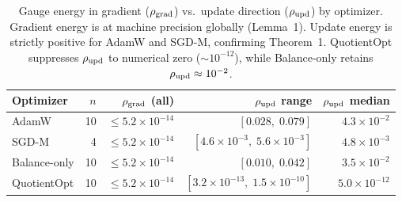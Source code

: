 \begin{table}[t]
\centering
\caption{Gauge energy in gradient ($\rho_{\rm grad}$) vs.\ update direction ($\rho_{\rm upd}$)
  by optimizer. Gradient energy is at machine precision globally (Lemma~1). Update energy is
  strictly positive for AdamW and SGD-M, confirming Theorem~1. QuotientOpt suppresses
  $\rho_{\rm upd}$ to numerical zero (${\sim}10^{-12}$), while Balance-only retains
  $\rho_{\rm upd}\approx 10^{-2}$.}
\label{tab:rho-summary}
\vspace{4pt}
\begin{tabular}{lrrrr}
\toprule
\textbf{Optimizer} & $n$ & $\rho_{\rm grad}$ (all) & $\rho_{\rm upd}$ range & $\rho_{\rm upd}$ median \\
\midrule
AdamW        & 10 & $\leq 5.2{\times}10^{-14}$ & $[0.028,\; 0.079]$ & $4.3{\times}10^{-2}$ \\
SGD-M        &  4 & $\leq 5.2{\times}10^{-14}$ & $[4.6{\times}10^{-3},\; 5.6{\times}10^{-3}]$ & $4.8{\times}10^{-3}$ \\
Balance-only & 10 & $\leq 5.2{\times}10^{-14}$ & $[0.010,\; 0.042]$ & $3.5{\times}10^{-2}$ \\
\rowcolor{oursbg}QuotientOpt  & 10 & $\leq 5.2{\times}10^{-14}$ & $[3.2{\times}10^{-13},\; 1.5{\times}10^{-10}]$ & $5.0{\times}10^{-12}$ \\
\bottomrule
\end{tabular}
\end{table}
